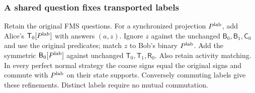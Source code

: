 \subsubsection{A shared question fixes transported labels}
\begin{lemma}\label{lem:label}
Retain the original FMS questions. For a synchronized projection $P^{\rm lab}$, add Alice's $\mathsf T_0[P^{\rm lab}]$ with answers $(a,z)$. Ignore $z$ against the unchanged $\mathsf B_0,\mathsf B_1,\mathsf C_0$ and use the original predicates; match $z$ to Bob's binary $P^{\rm lab}$. Add the symmetric $\mathsf B_0[P^{\rm lab}]$ against unchanged $\mathsf T_0,\mathsf T_1,\mathsf R_0$. Also retain activity matching. In every perfect normal strategy the coarse signs equal the original signs and commute with $P^{\rm lab}$ on their state supports. Conversely commuting labels give these refinements. Distinct labels require no mutual commutation.
\end{lemma}
